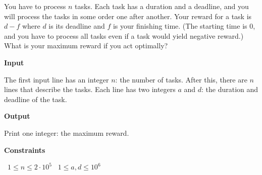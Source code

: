 You have to process $n$ tasks. Each task has a duration and a deadline, and you will process the tasks in some order one after another. Your reward for a task is $d-f$ where $d$ is its deadline and $f$ is your finishing time. (The starting time is $0$, and you have to process all tasks even if a task would yield negative reward.)
What is your maximum reward if you act optimally?

\vspace{0.3cm}\noindent\textbf{Input}

The first input line has an integer $n$: the number of tasks.
After this, there are $n$ lines that describe the tasks. Each line has two integers $a$ and $d$: the duration and deadline of the task.

\vspace{0.3cm}\noindent\textbf{Output}

Print one integer: the maximum reward.

\vspace{0.3cm}\noindent\textbf{Constraints}

\textbullet\ $1 \le n \le 2 \cdot 10^5$
\textbullet\ $1 \le a,d \le 10^6$